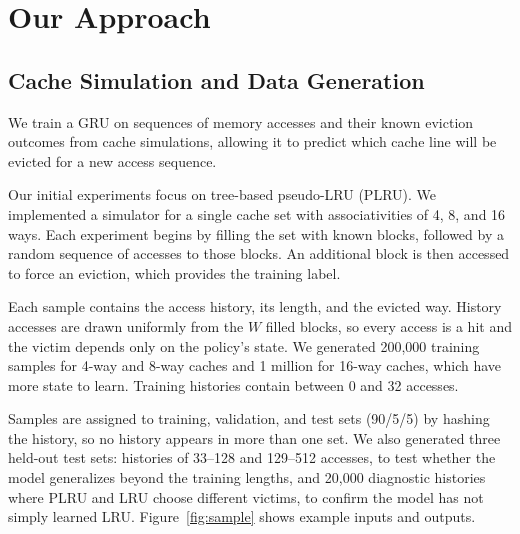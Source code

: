 \section{Our Approach}
\label{sec:approach}

\subsection{Cache Simulation and Data Generation}

We train a GRU on sequences of memory accesses and their known eviction outcomes from cache simulations, allowing it to predict which cache line will be evicted for a new access sequence.

Our initial experiments focus on tree-based pseudo-LRU
(PLRU). We implemented a simulator for a single cache set
with associativities of 4, 8, and 16 ways. Each experiment
begins by filling the set with known blocks, followed by a
random sequence of accesses to those blocks. An additional block is then
accessed to force an eviction, which provides the training
label.

Each sample contains the access history, its length, and
the evicted way. History accesses are drawn uniformly from
the $W$ filled blocks, so every access is a hit and the
victim depends only on the policy's state. We generated
200,000 training samples for 4-way and 8-way caches and
1 million for 16-way caches, which have more state to learn.
Training histories contain between 0 and 32 accesses.

Samples are assigned to training, validation, and test sets
(90/5/5) by hashing the history, so no history appears in
more than one set. We also generated three held-out test
sets: histories of 33--128 and 129--512 accesses, to test
whether the model generalizes beyond the training lengths,
and 20,000 diagnostic histories where PLRU and LRU choose
different victims, to confirm the model has not simply
learned LRU. Figure~\ref{fig:sample} shows example inputs
and outputs.

